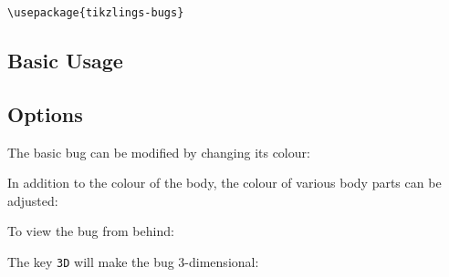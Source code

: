 \documentclass[parskip=half]{scrartcl}
\begin{document}
\begin{tcolorbox}[lower separated=false, lefthand width=.8\linewidth]
\vspace*{0.5cm}
\lstinline|\usepackage{tikzlings-bugs}| 
\vspace*{0.5cm}
\end{tcolorbox}

\subsection{Basic Usage}

\begin{tcblisting}{}
\bug
\end{tcblisting}

\subsection{Options}

The basic bug can be modified by changing its colour:
\begin{tcblisting}{}
\bug[body=blue]
\end{tcblisting}

In addition to the colour of the body, the colour of various body parts can be adjusted:
\begin{tcblisting}{}
\bug[antennas=blue]
\end{tcblisting}
\begin{tcblisting}{}
\bug[eye=blue]
\end{tcblisting}
\begin{tcblisting}{}
\bug[pupil=blue]
\end{tcblisting}
\begin{tcblisting}{}
\bug[mouth=blue]
\end{tcblisting}
\begin{tcblisting}{}
\bug[arms=blue]
\end{tcblisting}
\begin{tcblisting}{}
\bug[wings=blue]
\end{tcblisting}
\begin{tcblisting}{}
\bug[feet=blue]
\end{tcblisting}

To view the bug from behind:
\begin{tcblisting}{}
\bug[back]
\end{tcblisting}

The key \lstinline|3D| will make the bug 3-dimensional:
\begin{tcblisting}{}
\bug[3D]
\end{tcblisting}
\end{document}
